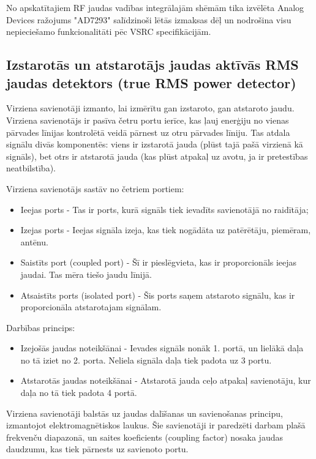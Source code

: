 No apskatītajiem RF jaudas vadības integrālajām shēmām tika  izvēlēta Analog Devices ražojums "AD7293" salīdzinoši lētās izmaksas dēļ un nodrošina visu nepieciešamo funkcionalitāti pēc VSRC specifikācijām.

\subsection{Izstarotās un atstarotājs jaudas aktīvās RMS jaudas detektors (true RMS power detector)}
Virziena savienotāji izmanto, lai izmērītu gan izstaroto, gan atstaroto jaudu. Virziena savienotājs ir pasīva četru portu ierīce, kas ļauj enerģiju no vienas pārvades līnijas kontrolētā veidā pārnest uz otru pārvades līniju. Tas atdala signālu divās komponentēs: viens ir izstarotā jauda (plūst tajā pašā virzienā kā signāls), bet otrs ir atstarotā jauda (kas plūst atpakaļ uz avotu, ja ir pretestības neatbilstība).

Virziena savienotājs sastāv no četriem portiem:
\begin{itemize}
    \item Ieejas ports - Tas ir ports, kurā signāls tiek ievadīts savienotājā no raidītāja;
    \item Izejas ports - Ieejas signāla izeja, kas tiek nogādāta uz patērētāju, piemēram, antēnu.
    \item Saistīts port (coupled port) - Šī ir pieslēgvieta, kas ir proporcionāls ieejas jaudai. Tas mēra tiešo jaudu līnijā.
    \item Atsaistīts ports (isolated port) - Šis ports saņem atstaroto signālu, kas ir proporcionāla atstarotajam signālam.
\end{itemize}

Darbības princips:
\begin{itemize}
    \item Izejošās jaudas noteikšānai - Ievades signāls nonāk 1. portā, un lielākā daļa no tā iziet no 2. porta. Neliela signāla daļa tiek padota uz 3 portu.
    \item Atstarotās jaudas noteikšānai - Atstarotā jauda ceļo atpakaļ savienotāju, kur daļa no tā tiek padota 4 portā.
\end{itemize}

Virziena savienotāji balstās uz jaudas dalīšanas un savienošanas principu, izmantojot elektromagnētiskos laukus. Šie savienotāji ir paredzēti darbam plašā frekvenču diapazonā, un saites koeficients (coupling factor) nosaka jaudas daudzumu, kas tiek pārnests uz savienoto portu.

